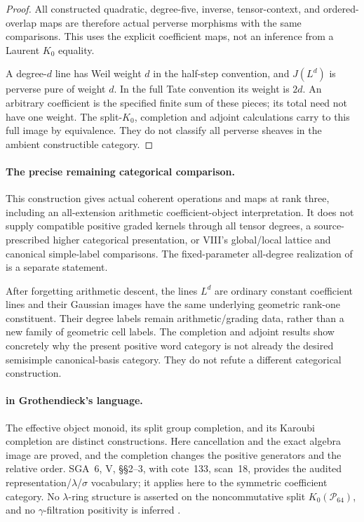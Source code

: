\begin{proof}
All constructed quadratic, degree-five, inverse,
tensor-context, and ordered-overlap maps are therefore
actual perverse morphisms with the same comparisons.
This uses the explicit coefficient maps, not an
inference from a Laurent $K_0$ equality.

A degree-$d$ line has Weil weight $d$ in the half-step
convention, and $J(L^d)$ is perverse pure of weight $d$.
In the full Tate convention its weight is $2d$.
An arbitrary coefficient is the specified finite sum
of these pieces; its total need not have one weight.
The split-$K_0$, completion and adjoint calculations
carry to this full image by equivalence.
They do not classify all perverse sheaves in the
ambient constructible category.
\end{proof}

\paragraph{The precise remaining categorical comparison.}
This construction gives actual coherent operations and
maps at rank three, including an all-extension arithmetic
coefficient-object interpretation.
It does not supply compatible positive graded kernels
through all tensor degrees, a source-prescribed higher
categorical presentation, or VIII's global/local lattice and canonical
simple-label comparisons.
The fixed-parameter all-degree realization of 
is a separate statement.

After forgetting arithmetic descent, the lines $L^d$
are ordinary constant coefficient lines and their Gaussian
images have the same underlying geometric rank-one
constituent.
Their degree labels remain arithmetic/grading data,
rather than a new family of geometric cell labels.
The completion and adjoint results show concretely
why the present positive word category is not already
the desired semisimple canonical-basis category.
They do not refute a different categorical construction.

\paragraph{ in Grothendieck's language.}
The effective object monoid, its split group completion,
and its Karoubi completion are distinct constructions.
Here cancellation and the exact algebra image are proved,
and the completion changes the positive generators and
the relative order.
SGA~6, V, \S\S2--3, with cote~133, scan~18, provides the
audited representation/$\lambda$/$\sigma$ vocabulary;
it applies here to the symmetric coefficient category.
No $\lambda$-ring structure is asserted on the
noncommutative split $K_0(\mathcal P_{64})$, and
no $\gamma$-filtration positivity is inferred
\cite{SGA6,Archive}.

